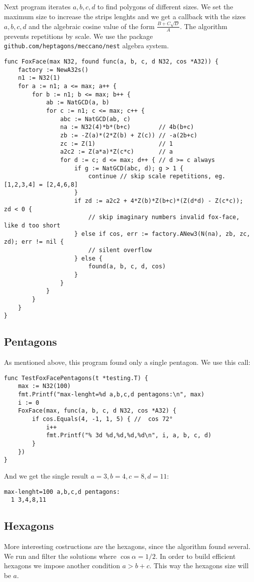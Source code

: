 \documentclass[11pt]{article}
\begin{document}
Next program iterates $a,b,c,d$ to find polygons of different sizes.
We set the maximum size to increase the strips lenghts and we get a callback with the
sizes $a,b,c,d$ and the algebraic cosine value of the form $\frac{B+C\sqrt{D}}{A}$. The algorithm prevents repetitions
by scale. We use the package \texttt{github.com/heptagons/meccano/nest} algebra system.
\begin{lstlisting}
func FoxFace(max N32, found func(a, b, c, d N32, cos *A32)) {
	factory := NewA32s()
	n1 := N32(1)
	for a := n1; a <= max; a++ {
		for b := n1; b <= max; b++ {
			ab := NatGCD(a, b)
			for c := n1; c <= max; c++ {
				abc := NatGCD(ab, c)
				na := N32(4)*b*(b+c)        // 4b(b+c)
				zb := -Z(a)*(2*Z(b) + Z(c)) // -a(2b+c)
				zc := Z(1)                  // 1
				a2c2 := Z(a*a)*Z(c*c)       // a
				for d := c; d <= max; d++ { // d >= c always
					if g := NatGCD(abc, d); g > 1 {
						continue // skip scale repetitions, eg. [1,2,3,4] = [2,4,6,8]
					}
					if zd := a2c2 + 4*Z(b)*Z(b+c)*(Z(d*d) - Z(c*c)); zd < 0 {
						// skip imaginary numbers invalid fox-face, like d too short
					} else if cos, err := factory.ANew3(N(na), zb, zc, zd); err != nil {
						// silent overflow
					} else {
						found(a, b, c, d, cos)
					}
				}
			}
		}
	}
}
\end{lstlisting}

\subsection{Pentagons}
As mentioned above, this program found only a single pentagon. We use this call:
\begin{lstlisting}
func TestFoxFacePentagons(t *testing.T) {
	max := N32(100)
	fmt.Printf("max-lenght=%d a,b,c,d pentagons:\n", max)
	i := 0
	FoxFace(max, func(a, b, c, d N32, cos *A32) {
		if cos.Equals(4, -1, 1, 5) { //  cos 72°
			i++
			fmt.Printf("% 3d %d,%d,%d,%d\n", i, a, b, c, d)
		}
	})
}
\end{lstlisting}
And we get the single result $a=3, b=4, c=8, d=11$:
\begin{lstlisting}
max-lenght=100 a,b,c,d pentagons:
  1 3,4,8,11
\end{lstlisting}

\subsection{Hexagons}
More interesting costructions are the hexagons, since the algorithm found several.
We run and filter the solutions where $\cos{\alpha} = 1/2$. In order to build efficient
hexagons we impose another condition $a > b+c$. This way the hexagons size will be $a$.
\end{document}

